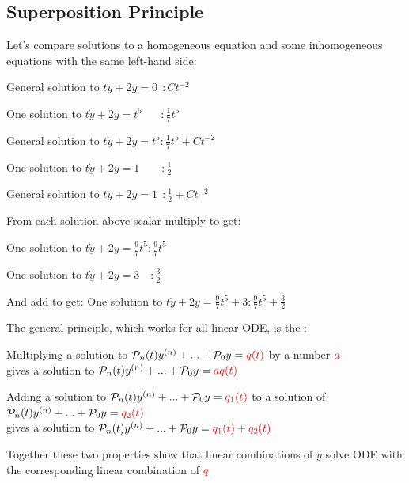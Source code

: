 \documentclass[11pt, openright]{book}
\begin{document}
\subsection{Superposition Principle}

Let's compare solutions to a homogeneous equation and some inhomogeneous equations with the same left-hand side:
\begin{items}[-2pt]{-15pt}{-15pt}
    \item General solution to $t\dot{y}+2y=0\ \  : Ct^{-2}$
    \item One solution to $t\dot{y}+2y=t^5 \ \ \ \quad: \frac{1}{7}t^5$
    \item General solution to $t\dot{y}+2y=t^5 : \frac{1}{7}t^5+Ct^{-2}$
    \item One solution to $t\dot{y}+2y=1 \quad\quad: \frac{1}{2}$
    \item General solution to $t\dot{y}+2y=1\ \  : \frac{1}{2}+Ct^{-2}$
\end{items}

From each solution above scalar multiply to get:
\begin{items}[-2pt]{-15pt}{-15pt}
    \item One solution to $t\dot{y}+2y=\frac{9}{7}t^5 : \frac{9}{7}t^5$
    \item One solution to $t\dot{y}+2y=3\quad  : \frac{3}{2}$
\end{items}

And add to get: One solution to $t\dot{y}+2y=\frac{9}{7}t^5+3 : \frac{9}{7}t^5+\frac{3}{2}$

\newpage

The general principle, which works for all linear ODE, is the :
\begin{items}{-15pt}{-15pt}
    \item Multiplying a solution to $\mathcal{P}_n(t)y^{(n)}+...+\mathcal{P}_0y=\textcolor{red}{q(t)}$ by a number $\textcolor{red}{a}$\\
    \tab gives a solution to $\mathcal{P}_n(t)y^{(n)}+...+\mathcal{P}_0y=\textcolor{red}{aq(t)}$
    \item Adding a solution to $\mathcal{P}_n(t)y^{(n)}+...+\mathcal{P}_0y=\textcolor{red}{q_1(t)}$ to a solution of $\mathcal{P}_n(t)y^{(n)}+...+\mathcal{P}_0y=\textcolor{red}{q_2(t)}$\\
    \tab gives a solution to $\mathcal{P}_n(t)y^{(n)}+...+\mathcal{P}_0y=\textcolor{red}{q_1(t)+q_2(t)}$
\end{items}

Together these two properties show that linear combinations of $y$ solve ODE with the corresponding linear combination of $\textcolor{red}{q}$
\end{document}
